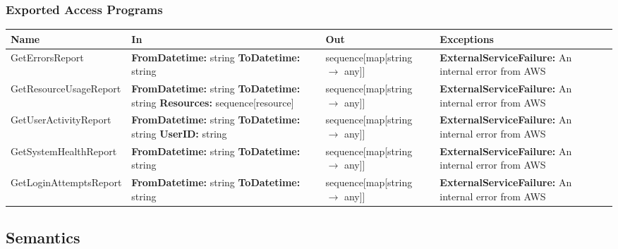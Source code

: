 \documentclass[12pt, titlepage]{article}
\begin{document}
\subsubsection{Exported Access Programs}
\begin{center}
  \begin{tabular}{p{4.5cm} p{4cm} p{4cm} p{4cm}}
    \hline
    \textbf{Name} & \textbf{In} & \textbf{Out} & \textbf{Exceptions} \\
    \hline

    GetErrorsReport & \textbf{FromDatetime:} string \newline
    \textbf{ToDatetime:} string&
    sequence[map[string $\rightarrow$ any]] &
    \textbf{ExternalServiceFailure:} An internal error from AWS
    \\
    \hline
    GetResourceUsageReport & \textbf{FromDatetime:} string \newline
    \textbf{ToDatetime:} string \newline
    \textbf{Resources:} \newline sequence[resource]&
    sequence[map[string $\rightarrow$ any]] &
    \textbf{ExternalServiceFailure:} An internal error from AWS
    \\
    \hline
    GetUserActivityReport & \textbf{FromDatetime:} string \newline
    \textbf{ToDatetime:} string \newline
    \textbf{UserID:} string&
    sequence[map[string $\rightarrow$ any]] &
    \textbf{ExternalServiceFailure:} An internal error from AWS
    \\
    \hline
    GetSystemHealthReport & \textbf{FromDatetime:} string \newline
    \textbf{ToDatetime:} string &
    sequence[map[string $\rightarrow$ any]] &
    \textbf{ExternalServiceFailure:} An internal error from AWS
    \\
    \hline
    GetLoginAttemptsReport & \textbf{FromDatetime:} string \newline
    \textbf{ToDatetime:} string &
    sequence[map[string $\rightarrow$ any]] &
    \textbf{ExternalServiceFailure:} An internal error from AWS
    \\
    \hline
  \end{tabular}
\end{center}

\subsection{Semantics}
\end{document}

